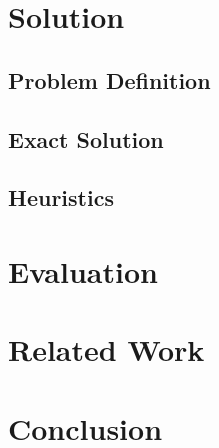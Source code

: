 \documentclass[sigplan,10pt,review,anonymous]{acmart}\settopmatter{printfolios=true}
\begin{document}





\section{Solution}
\label{sec:sol}

\subsection{Problem Definition}
\label{sub:prob}

\subsection{Exact Solution}
\label{sub:exact}

\subsection{Heuristics}
\label{sub:heu}

\section{Evaluation}
\label{sec:eval}

\section{Related Work}
\label{sec:rw}

\section{Conclusion}
\label{sec:conc}


%

\end{document}
